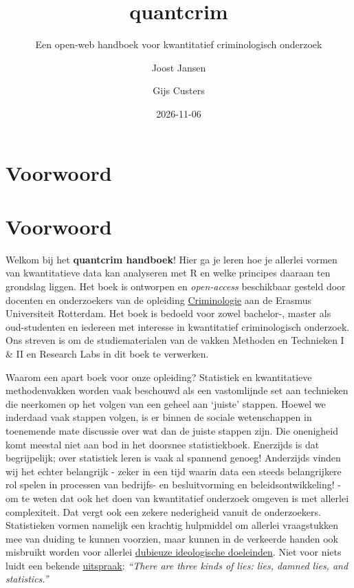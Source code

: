\documentclass[
  letterpaper,
  DIV=11,
  numbers=noendperiod]{scrreprt}
\title{quantcrim}
\subtitle{Een open-web handboek voor kwantitatief criminologisch
onderzoek}
\author{Joost Jansen \and Gijs Custers}
\date{2026-11-06}
\renewcommand*\contentsname{Table of contents}
\newcommand\contentsname{Table of contents}
\begin{document}
\maketitle

\renewcommand*\contentsname{Table of contents}
{
\setcounter{tocdepth}{2}
\tableofcontents
}


\chapter{Voorwoord}\label{voorwoord}


\chapter*{Voorwoord}\label{voorwoord-1}


Welkom bij het \textbf{quantcrim handboek}! Hier ga je leren hoe je
allerlei vormen van kwantitatieve data kan analyseren met R en welke
principes daaraan ten grondslag liggen. Het boek is ontworpen en
\emph{open-access} beschikbaar gesteld door docenten en onderzoekers van
de opleiding
\href{https://www.eur.nl/bachelor/criminologie}{Criminologie} aan de
Erasmus Universiteit Rotterdam. Het boek is bedoeld voor zowel
bachelor-, master als oud-studenten en iedereen met interesse in
kwantitatief criminologisch onderzoek. Ons streven is om de
studiematerialen van de vakken Methoden en Technieken I \& II en
Research Labs in dit boek te verwerken.

Waarom een apart boek voor onze opleiding? Statistiek en kwantitatieve
methodenvakken worden vaak beschouwd als een vastomlijnde set aan
technieken die neerkomen op het volgen van een geheel aan `juiste'
stappen. Hoewel we inderdaad vaak stappen volgen, is er binnen de
sociale wetenschappen in toenemende mate discussie over wat dan de
juiste stappen zijn. Die onenigheid komt meestal niet aan bod in het
doorsnee statistiekboek. Enerzijds is dat begrijpelijk; over statistiek
leren is vaak al spannend genoeg! Anderzijds vinden wij het echter
belangrijk - zeker in een tijd waarin data een steeds belangrijkere rol
spelen in processen van bedrijfs- en besluitvorming en
beleidsontwikkeling! - om te weten dat ook het doen van kwantitatief
onderzoek omgeven is met allerlei complexiteit. Dat vergt ook een zekere
nederigheid vanuit de onderzoekers. Statistieken vormen namelijk een
krachtig hulpmiddel om allerlei vraagstukken mee van duiding te kunnen
voorzien, maar kunnen in de verkeerde handen ook misbruikt worden voor
allerlei
\href{https://lareviewofbooks.org/article/the-correlation-between-statistics-and-eugenics/}{dubieuze
ideologische doeleinden}. Niet voor niets luidt een bekende
\href{https://en.wikipedia.org/wiki/Lies,_damned_lies,_and_statistics}{uitspraak}:
\emph{``There are three kinds of lies: lies, damned lies, and
statistics.''}
\end{document}

